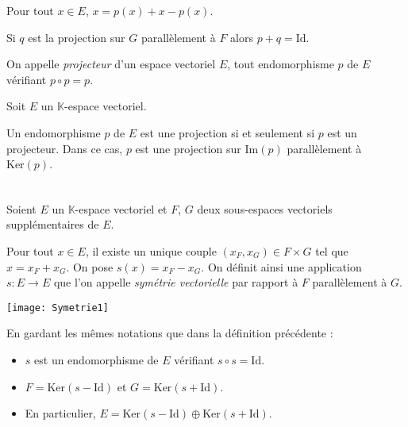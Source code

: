 \documentclass[a4paper,10pt]{report}
\begin{document}
\begin{rems} 
\item Pour tout $x \in E$, $x=p(x)+x-p(x)$. 
\item Si $q$ est la projection sur $G$ parallèlement à $F$ alors $p+q=\textrm{Id}$.
\end{rems}

\begin{defin} On appelle \textit{projecteur} d'un espace vectoriel $E$, tout endomorphisme $p$ de $E$ vérifiant $p \circ p = p$.
\end{defin}

\begin{prop} Soit $E$ un $\mathbb{K}$-espace vectoriel.

\noindent Un endomorphisme $p$ de $E$ est une projection si et seulement si $p$ est un projecteur. Dans ce cas, $p$ est une projection sur $\textrm{Im}(p)$ parallèlement à $\textrm{Ker}(p)$.
\end{prop}

\begin{preuve}
\vspace{12cm}
\newpage

$\phantom{tes}$

\vspace{8cm}
\end{preuve}


\begin{defin} Soient $E$ un $\mathbb{K}$-espace vectoriel et $F$, $G$ deux sous-espaces vectoriels supplémentaires de $E$.

\noindent Pour tout $x \in E$, il existe un unique couple $(x_F,x_G) \in F \times G$ tel que $x=x_F+x_G$. On pose \newline $s(x)=x_F-x_G$. On définit ainsi une application $s : E \rightarrow E$ que l'on appelle \textit{symétrie vectorielle} par rapport à $F$ parallèlement à $G$. 
\end{defin}

\begin{center}
\texttt{[image: Symetrie1]}
\end{center}

\begin{prop} En gardant les mêmes notations que dans la définition précédente :
\begin{itemize}
\item $s$ est un endomorphisme de $E$ vérifiant $s \circ s = \textrm{Id}$.
\item $F = \textrm{Ker}(s-\textrm{Id})$ et $G= \textrm{Ker}(s+\textrm{Id})$.
\item En particulier, $E= \textrm{Ker}(s-\textrm{Id}) \oplus \textrm{Ker}(s+\textrm{Id})$.
\end{itemize}
\end{prop}
\end{document}
